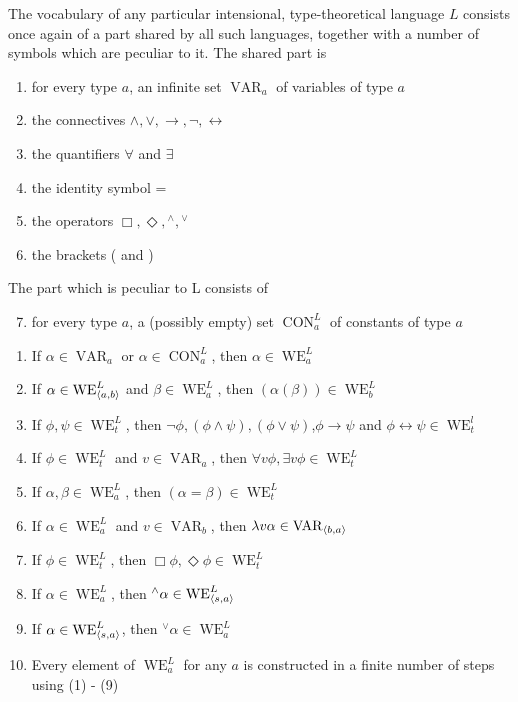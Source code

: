 \documentclass[11pt]{article}
\DeclareMathOperator{\VAR}{VAR}
\DeclareMathOperator{\CON}{CON}
\DeclareMathOperator{\WE}{WE}
\begin{document}
The vocabulary of any particular intensional, type-theoretical language \(L\)
consists once again of a part shared by all such languages, together with a
number of symbols which are peculiar to it. The shared part is
\begin{enumerate}
\item for every type \(a\), an infinite set \(\VAR_a\) of variables of type \(a\)
\item the connectives \(\wedge,\vee,\to,\neg,\leftrightarrow\)
\item the quantifiers \(\forall\) and \(\exists\)
\item the identity symbol =
\item the operators \(\Box,\Diamond,{}^\wedge,{}^\vee\)
\item the brackets ( and )
\end{enumerate}


The part which is peculiar to L consists of
\begin{enumerate}
\setcounter{enumi}{6}
\item for every type \(a\), a (possibly empty) set \(\CON_a^L\) of
constants of type \(a\)
\end{enumerate}


\begin{definition}[]
\begin{enumerate}
\item If \(\alpha\in\VAR_a\) or \(\alpha\in\CON_a^L\), then \(\alpha\in\WE_a^L\)
\item If \(\alpha\in\WE_{\la a,b\ra}^L\) and \(\beta\in\WE_a^L\), then \((\alpha(\beta))\in\WE_b^L\)
\item If \(\phi,\psi\in\WE_t^L\), then
\(\neg\phi,(\phi\wedge\psi),(\phi\vee\psi)\),\(\phi\to\psi\) and
\(\phi\leftrightarrow\psi\in\WE_t^l\)
\item If \(\phi\in\WE_t^L\) and \(v\in\VAR_a\), then \(\forall v\phi,\exists v\phi\in\WE_t^L\)
\item If \(\alpha,\beta\in\WE_a^L\), then \((\alpha=\beta)\in\WE_t^L\)
\item If \(\alpha\in\WE_a^L\) and \(v\in\VAR_b\), then \(\lambda v\alpha\in\VAR_{\la b,a\ra}\)
\item If \(\phi\in\WE_t^L\), then \(\Box\phi,\Diamond\phi\in\WE_t^L\)
\item If \(\alpha\in\WE_a^L\), then \({}^\wedge\alpha\in\WE_{\la s,a\ra}^L\)
\item If \(\alpha\in\WE_{\la s,a\ra}^L\), then \({}^\vee\alpha\in\WE_a^L\)
\item Every element of \(\WE_a^L\) for any \(a\) is constructed in a finite
number of steps using (1) - (9)
\end{enumerate}
\end{definition}
\end{document}
